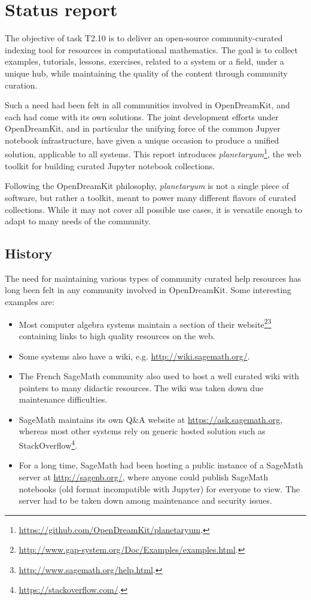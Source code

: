 \hypertarget{status-report}{%
\section{Status report}\label{status-report}}

The objective of task T2.10 is to deliver an open-source
community-curated indexing tool for resources in computational
mathematics. The goal is to collect examples, tutorials, lessons,
exercises, related to a system or a field, under a unique hub, while
maintaining the quality of the content through community curation.

Such a need had been felt in all communities involved in OpenDreamKit,
and each had come with its own solutions. The joint development efforts
under OpenDreamKit, and in particular the unifying force of the common
Jupyer notebook infrastructure, have given a unique occasion to produce
a unified solution, applicable to all systems. This report introduces
\emph{planetaryum}\footnote{\url{https://github.com/OpenDreamKit/planetaryum}.},
the web toolkit for building curated Jupyter notebook collections.

Following the OpenDreamKit philosophy, \emph{planetaryum} is not a
single piece of software, but rather a toolkit, meant to power many
different flavors of curated collections. While it may not cover all
possible use cases, it is versatile enough to adapt to many needs of the
community.

\hypertarget{history}{%
\subsection{History}\label{history}}

The need for maintaining various types of community curated help
resources has long been felt in any community involved in OpenDreamKit.
Some interesting examples are:

\begin{itemize}
\item
  Most computer algebra systems maintain a section of their
  website\footnote{\url{http://www.gap-system.org/Doc/Examples/examples.html}.}\footnote{\url{http://www.sagemath.org/help.html}.}
  containing links to high quality resources on the web.
\item
  Some systems also have a wiki, e.g. \url{http://wiki.sagemath.org/}.
\item
  The French SageMath community also used to host a well curated wiki
  with pointers to many didactic resources. The wiki was taken down due
  maintenance difficulties.
\item
  SageMath maintains its own Q\&A website at
  \url{https://ask.sagemath.org}, whereas most other systems rely on
  generic hosted solution such as StackOverflow\footnote{\url{https://stackoverflow.com/}.}.
\item
  For a long time, SageMath had been hosting a public instance of a
  SageMath server at \url{http://sagenb.org/}, where anyone could
  publish SageMath notebooks (old format incompatible with Jupyter) for
  everyone to view. The server had to be taken down among maintenance
  and security issues.
\end{itemize}

